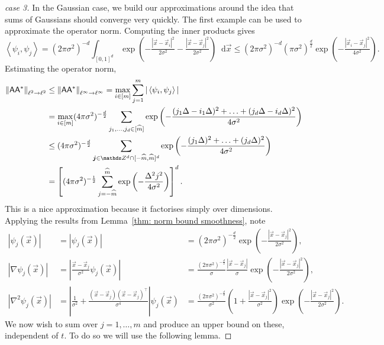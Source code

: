 \documentclass[smallextended]{svjour3}
\let\F\mathds\let\C\mathcal\newcommand{\R}{\F{R}}\newcommand{\A}{\tens{A}}
\newcommand{\norm}[1]{{\left\lVert #1 \right\rVert}}
\newcommand{\IP}[2]{\left\langle #1,#2 \right\rangle}
\newcommand{\1}{\F{1}}
\renewcommand{\hat}{\widehat}\renewcommand{\tilde}{\widetilde}
\newcommand{\diff}{\mathop{}\!\mathrm{d}}
\begin{document}
	\begin{proof}[case 3]
		In the Gaussian case, we build our approximations around the idea that sums of Gaussians should converge very quickly. The first example can be used to approximate the operator norm. Computing the inner products gives
		\begin{equation}
			\IP{\psi_i}{\psi_j} = (2\pi\sigma^2)^{-d}\int_{[0,1]^d} \exp\left(-\tfrac{|\vec{x}-\vec{x}_i|^2}{2\sigma^2}-\tfrac{|\vec{x}-\vec{x}_j|^2}{2\sigma^2}\right)\diff\vec{x} \leq (2\pi\sigma^2)^{-d}(\pi\sigma^2)^{\frac{d}{2}}\exp\left(-\tfrac{|\vec{x}_i-\vec{x}_j|^2}{4\sigma^2}\right).
		\end{equation}
		Estimating the operator norm,
		\begin{align}
			\norm{\A\A^*}_{\ell^2\to\ell^2}&\leq \norm{\A\A^*}_{\ell^\infty\to\ell^\infty} = \max_{i\in[m]} \sum_{j=1}^m |\IP{\psi_i}{\psi_j}| 
			\\&= \max_{i\in[m]}(4\pi\sigma^2)^{-\frac d2}\sum_{j_1,\ldots,j_d\in[\hat m]} \exp\left(-\frac{(j_1\Delta-i_1\Delta)^2+\ldots+(j_d\Delta-i_d\Delta)^2}{4\sigma^2}\right)
			\\&\leq (4\pi\sigma^2)^{-\frac d2}\sum_{\vec j\in\F Z^d\cap[-\hat m,\hat m]^d} \exp\left(-\frac{(j_1\Delta)^2+\ldots+(j_d\Delta)^2}{4\sigma^2}\right)
			\\&= \left[(4\pi\sigma^2)^{-\frac 12}\sum_{j=-\hat m}^{\hat m} \exp\left(-\frac{\Delta^2j^2}{4\sigma^2}\right)\right]^d.
		\end{align}
		This is a nice approximation because it factorises simply over dimensions.
		Applying the results from Lemma~\ref{thm: norm bound smoothness}, note
		$$\begin{array}{rll}
			\displaystyle |\psi_j(\vec{x})| &\displaystyle= \left|\psi_j(\vec{x})\right| &\displaystyle = (2\pi\sigma^2)^{-\frac d2}\exp\left(-\frac{|\vec{x}-\vec{x}_j|^2}{2\sigma^2}\right),
			\\\displaystyle |\nabla\psi_j(\vec{x})| &\displaystyle= \left|\frac{\vec{x}-\vec{x}_j}{\sigma^2}\psi_j(\vec{x})\right| &\displaystyle = \frac{(2\pi\sigma^2)^{-\frac d2}}{\sigma}\frac{|\vec{x}-\vec{x}_j|}{\sigma}\exp\left(-\frac{|\vec{x}-\vec{x}_j|^2}{2\sigma^2}\right),
			\\|\nabla^2\psi_j(\vec{x})| &\displaystyle =\left|\frac1{\sigma^2} + \frac{(\vec{x}-\vec{x}_j)(\vec{x}-\vec{x}_j)^\top }{\sigma^4}\right|\psi_j(\vec{x}) &\displaystyle = \frac{(2\pi\sigma^2)^{-\frac d2}}{\sigma^2}\left(1+\frac{|\vec{x}-\vec{x}_j|^2}{\sigma^2}\right)\exp\left(-\frac{|\vec{x}-\vec{x}_j|^2}{2\sigma^2}\right).
		\end{array}$$
		We now wish to sum over $j=1,\ldots,m$ and produce an upper bound on these, independent of $t$. To do so we will use the following lemma.
		

\end{proof}
\end{document}
